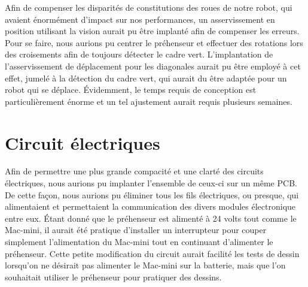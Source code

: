 Afin de compenser les disparités de constitutions des roues de notre robot, qui avaient énormément d'impact sur nos performances, un asservissement en position utilisant la vision aurait pu être implanté afin de compenser les erreurs. Pour se faire, nous aurions pu centrer le préhenseur et effectuer des rotations lors des croisements afin de toujours détecter le cadre vert. L'implantation de l'asservissement de déplacement pour les diagonales aurait pu être employé à cet effet, jumelé à la détection du cadre vert, qui aurait du être adaptée pour un robot qui se déplace. Évidemment, le temps requis de conception est particulièrement énorme et un tel ajustement aurait requis plusieurs semaines. 

\section{Circuit électriques}

Afin de permettre une plus grande compacité et une clarté des circuits électriques, nous aurions pu implanter l’ensemble de ceux-ci sur un même PCB. De cette façon, nous aurions pu éliminer tous les fils électriques, ou presque, qui alimentaient et permettaient la communication des divers modules électronique entre eux. Étant donné que le préhenseur est alimenté à 24 volts tout comme le Mac-mini, il aurait été pratique d’installer un interrupteur pour couper simplement l’alimentation du Mac-mini tout en continuant d’alimenter le préhenseur. Cette petite modification du circuit aurait facilité les tests de dessin lorsqu’on ne désirait pas alimenter le Mac-mini sur la batterie, mais que l’on souhaitait utiliser le préhenseur pour pratiquer des dessins.

